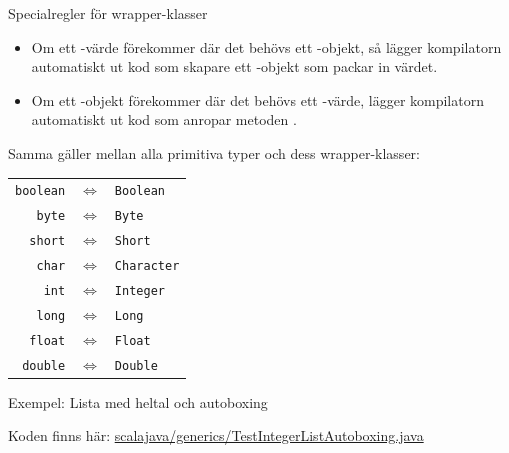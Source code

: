 \begin{Slide}{Specialregler för wrapper-klasser}\footnotesize
\begin{itemize}
\item Om ett -värde förekommer där det behövs ett -objekt, så lägger kompilatorn automatiskt ut kod som skapare ett -objekt som packar in värdet.
\item Om ett -objekt förekommer där det behövs ett -värde, lägger kompilatorn automatiskt ut kod som anropar metoden .
\end{itemize}
Samma gäller mellan alla primitiva typer och dess wrapper-klasser: 
\begin{table}
\center
\begin{tabular}{r c l}
 {\lstinline!boolean!} &$\Leftrightarrow$& {\lstinline!Boolean!} \\
 {\lstinline!byte!} &$\Leftrightarrow$& {\lstinline!Byte!}\\
 {\lstinline!short!}&$\Leftrightarrow$& {\lstinline!Short!}\\
 {\lstinline!char!} &$\Leftrightarrow$& {\lstinline!Character!}\\
 {\lstinline!int!} &$\Leftrightarrow$& {\lstinline!Integer!}\\
 {\lstinline!long!} &$\Leftrightarrow$& {\lstinline!Long!}\\
 {\lstinline!float!} &$\Leftrightarrow$& {\lstinline!Float!}\\
 {\lstinline!double!} &$\Leftrightarrow$&{\lstinline!Double!}\\
\end{tabular}
\end{table}
\end{Slide}

\begin{Slide}{Exempel: Lista med heltal och autoboxing}

\scriptsize Koden finns här: \href{https://github.com/lunduniversity/introprog/tree/master/compendium/examples/scalajava/generics/TestIntegerList.java}{scalajava/generics/TestIntegerListAutoboxing.java}
\end{Slide}

